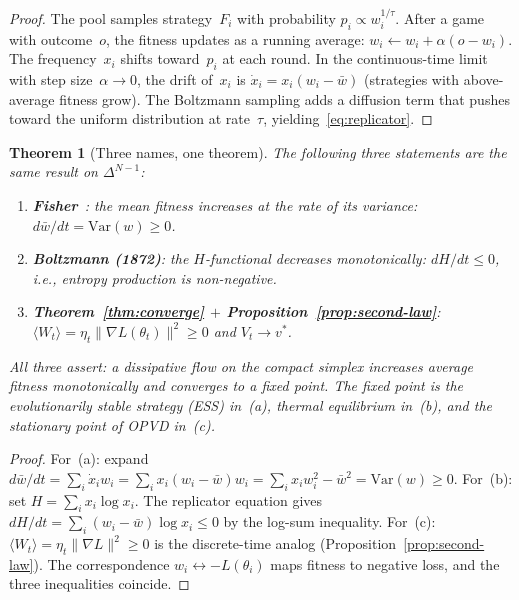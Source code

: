 \documentclass[11pt,a4paper]{article}
\newtheorem{theorem}{Theorem}[section]
\begin{document}
\begin{proof}
The pool samples strategy~$F_i$ with probability
$p_i \propto w_i^{1/\tau}$.
After a game with outcome~$o$, the fitness updates as a
running average: $w_i \leftarrow w_i + \alpha(o - w_i)$.
The frequency~$x_i$ shifts toward~$p_i$ at each round.
In the continuous-time limit with step size~$\alpha \to 0$,
the drift of~$x_i$ is
$\dot{x}_i = x_i(w_i - \bar{w})$
(strategies with above-average fitness grow).
The Boltzmann sampling adds a diffusion term that
pushes toward the uniform distribution at rate~$\tau$,
yielding~\eqref{eq:replicator}.
\end{proof}

\begin{theorem}[Three names, one theorem]\label{thm:three-names}
The following three statements are the same result on
$\Delta^{N-1}$:
\begin{enumerate}[nosep, label=\textup{(\alph*)}]
\item \textbf{Fisher}~\cite{Fisher1930}: the mean fitness
  increases at the rate of its variance:
  $d\bar{w}/dt = \mathrm{Var}(w) \geq 0$.
\item \textbf{Boltzmann (1872)}: the $H$-functional
  decreases monotonically: $dH/dt \leq 0$, i.e.,
  entropy production is non-negative.
\item \textbf{Theorem~\ref{thm:converge} $+$
  Proposition~\ref{prop:second-law}}:
  $\langle W_t \rangle
    = \eta_t \|\nabla L(\theta_t)\|^2 \geq 0$
  and $V_t \to v^*$.
\end{enumerate}
All three assert: a dissipative flow on the compact
simplex increases average fitness monotonically
and converges to a fixed point.
The fixed point is the evolutionarily stable strategy
(ESS) in~\textup{(a)}, thermal equilibrium in~\textup{(b)},
and the stationary point of OPVD in~\textup{(c)}.
\end{theorem}

\begin{proof}
For~(a): expand
$d\bar{w}/dt = \sum_i \dot{x}_i w_i
  = \sum_i x_i(w_i - \bar{w})w_i
  = \sum_i x_i w_i^2 - \bar{w}^2
  = \mathrm{Var}(w) \geq 0$.
For~(b): set $H = \sum_i x_i \log x_i$.
The replicator equation gives
$dH/dt = \sum_i (w_i - \bar{w})\log x_i \leq 0$
by the log-sum inequality.
For~(c): $\langle W_t \rangle
  = \eta_t \|\nabla L\|^2 \geq 0$
is the discrete-time analog (Proposition~\ref{prop:second-law}).
The correspondence $w_i \leftrightarrow -L(\theta_i)$
maps fitness to negative loss, and the three inequalities
coincide.
\end{proof}
\end{document}

